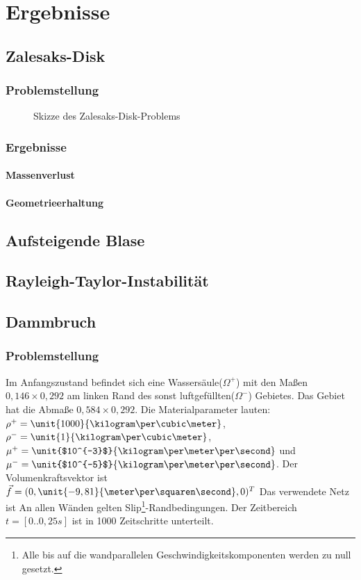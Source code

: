 
\chapter{Ergebnisse}
\section{Zalesaks-Disk}
\subsection{Problemstellung}

\def\svgwidth{0.4\textwidth}
\begin{figure}[ht]
\centering
\caption{Skizze des Zalesaks-Disk-Problems}
\end{figure} 

\subsection{Ergebnisse}
\subsubsection{Massenverlust}
\subsubsection{Geometrieerhaltung}

\section{Aufsteigende Blase}
\section{Rayleigh-Taylor-Instabilität}

\section{Dammbruch}
\subsection{Problemstellung}
Im Anfangszustand befindet sich eine Wassersäule($\Omega^+$) mit den Maßen $0{,}146\times0{,}292$ am linken Rand des sonst luftgefüllten($\Omega^-$) Gebietes. Das Gebiet hat die Abmaße $0{,}584\times0{,}292$. Die Materialparameter lauten: $\rho^+=\unit{1000}{\kilogram\per\cubic\meter}$, $\rho^-=\unit{1}{\kilogram\per\cubic\meter}$, $\mu^+ = \unit{$10^{-3}$}{\kilogram\per\meter\per\second}$ und $\mu^-= \unit{$10^{-5}$}{\kilogram\per\meter\per\second}$. Der Volumenkraftsvektor ist $\vect{f} = (0, \unit{-9,81}{\meter\per\squaren\second}, 0)^T$ Das verwendete Netz ist %
An allen Wänden gelten Slip\footnote{Alle bis auf die wandparallelen Geschwindigkeitskomponenten werden zu null gesetzt.}-Randbedingungen. Der Zeitbereich $t = [0..0{,}25s]$ ist in 1000 Zeitschritte unterteilt.


